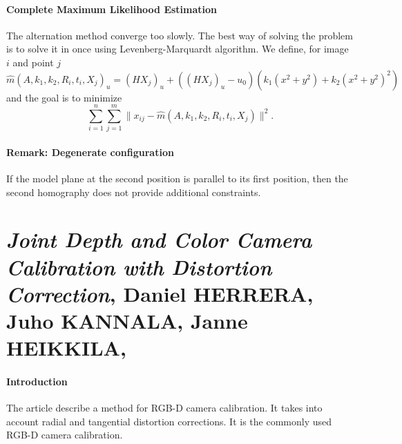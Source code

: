 \documentclass[11pt,a4paper]{article}
\begin{document}
\paragraph{Complete Maximum Likelihood Estimation}
The alternation method converge too slowly. The best way of solving the problem is to solve it in once using Levenberg-Marquardt algorithm. We define, for image $i$ and point $j$
\begin{equation}
\hat{m}(A,k_1,k_2,R_i,t_i,X_j)_u = (HX_j)_u + ((HX_j)_u-u_0)\left(k_1(x^2+y^2) + k_2(x^2+y^2)^2\right)
\end{equation}
and the goal is to minimize
\begin{equation}
\sum_{i=1}^{n} \sum_{j=1}^{m} \| x_{ij} - \hat{m}(A,k_1,k_2,R_i,t_i,X_j) \|^2.
\end{equation}

\paragraph{Remark: Degenerate configuration}
If the model plane at the second position is parallel to its first position, then the second homography does not provide additional constraints.

\section{\textit{Joint Depth and Color Camera Calibration with Distortion Correction}, Daniel HERRERA, Juho KANNALA, Janne HEIKKILA, \cite{Herrera2012}}

\paragraph{Introduction} The article describe a method for RGB-D camera calibration. It takes into account radial and tangential distortion corrections. It is the commonly used RGB-D camera calibration. 
\end{document}
